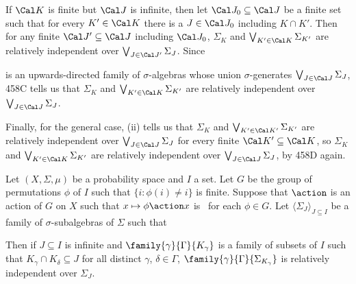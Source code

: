 {\medskip

 If $\Cal K$ is finite but $\Cal J$ is infinite, then
let $\Cal J_0\subseteq\Cal J$ be a finite set such that for every
$K'\in\Cal K$ there is a $J\in\Cal J_0$ including $K\cap K'$.
Then for any finite $\Cal J'\subseteq\Cal J$ including $\Cal J_0$,
$\Sigma_K$ and $\bigvee_{K'\in\Cal K}\Sigma_{K'}$
are relatively independent over $\bigvee_{J\in\Cal J'}\Sigma_J$.   Since


\noindent is an upwards-directed family of $\sigma$-algebras whose union
$\sigma$-generates $\bigvee_{J\in\Cal J}\Sigma_J$, 458C tells us that
$\Sigma_K$ and $\bigvee_{K'\in\Cal K}\Sigma_{K'}$ are relatively independent
over $\bigvee_{J\in\Cal J}\Sigma_J$.

\medskip

 Finally, for the general case, (ii) tells us that
$\Sigma_K$ and $\bigvee_{K'\in\Cal K'}\Sigma_{K'}$
are relatively independent
over $\bigvee_{J\in\Cal J}\Sigma_J$ for every finite
$\Cal K'\subseteq\Cal K$, so $\Sigma_K$ and
$\bigvee_{K'\in\Cal K}\Sigma_{K'}$ are relatively independent
over $\bigvee_{J\in\Cal J}\Sigma_J$, by 458D again.
}%

Let $(X,\Sigma,\mu)$ be a probability space and
$I$ a set.   Let $G$ be the group of permutations $\phi$ of $I$ such that
$\{i:\phi(i)\ne i\}$ is finite.   Suppose that $\action$ is an action of
$G$ on $X$ such that $x\mapsto\phi\action x$ is \imp\ for each $\phi\in G$.
Let $\langle\Sigma_J\rangle_{J\subseteq I}$ be a family of
$\sigma$-subalgebras of $\Sigma$ such that


\noindent Then if $J\subseteq I$ is infinite and
$\family{\gamma}{\Gamma}{K_{\gamma}}$ is a family of subsets of $I$ such
that $K_{\gamma}\cap K_{\delta}\subseteq J$ for all distinct $\gamma$,
$\delta\in\Gamma$, $\family{\gamma}{\Gamma}{\Sigma_{K_{\gamma}}}$ is
relatively independent over $\Sigma_J$.

